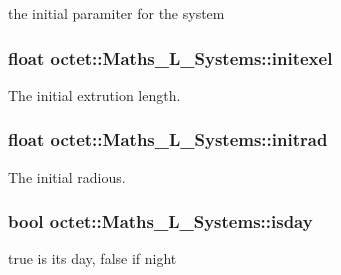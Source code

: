the initial paramiter for the system 

\hypertarget{classoctet_1_1_maths___l___systems_a0c7beee6e733f6f1912807f2f2912fe8}{
\subsubsection[{initexel}]{\setlength{\rightskip}{0pt plus 5cm}float octet\+::\+Maths\+\_\+\+L\+\_\+\+Systems\+::initexel\hspace{0.3cm}{\ttfamily [private]}}}\label{classoctet_1_1_maths___l___systems_a0c7beee6e733f6f1912807f2f2912fe8}


The initial extrution length. 

\hypertarget{classoctet_1_1_maths___l___systems_acd18538c7b279c111b52f3286be824b3}{
\subsubsection[{initrad}]{\setlength{\rightskip}{0pt plus 5cm}float octet\+::\+Maths\+\_\+\+L\+\_\+\+Systems\+::initrad\hspace{0.3cm}{\ttfamily [private]}}}\label{classoctet_1_1_maths___l___systems_acd18538c7b279c111b52f3286be824b3}


The initial radious. 

\hypertarget{classoctet_1_1_maths___l___systems_a656e4a1c5ecad3857ed35fa9b7d27a53}{
\subsubsection[{isday}]{\setlength{\rightskip}{0pt plus 5cm}bool octet\+::\+Maths\+\_\+\+L\+\_\+\+Systems\+::isday\hspace{0.3cm}{\ttfamily [private]}}}\label{classoctet_1_1_maths___l___systems_a656e4a1c5ecad3857ed35fa9b7d27a53}


true is its day, false if night 

